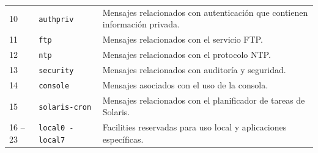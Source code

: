 \begin{longtable}{p{2.0cm} p{4.0cm} p{9.0cm}}
    10 & \texttt{authpriv} &
    Mensajes relacionados con autenticación que contienen información privada. \\

    11 & \texttt{ftp} &
    Mensajes relacionados con el servicio FTP. \\

    12 & \texttt{ntp} &
    Mensajes relacionados con el protocolo NTP. \\

    13 & \texttt{security} &
    Mensajes relacionados con auditoría y seguridad. \\

    14 & \texttt{console} &
    Mensajes asociados con el uso de la consola. \\

    15 & \texttt{solaris-cron} &
    Mensajes relacionados con el planificador de tareas de Solaris. \\

    16 -- 23 & \texttt{local0 - local7} &
     Facilities reservadas para uso local y aplicaciones específicas. \\
\end{longtable}